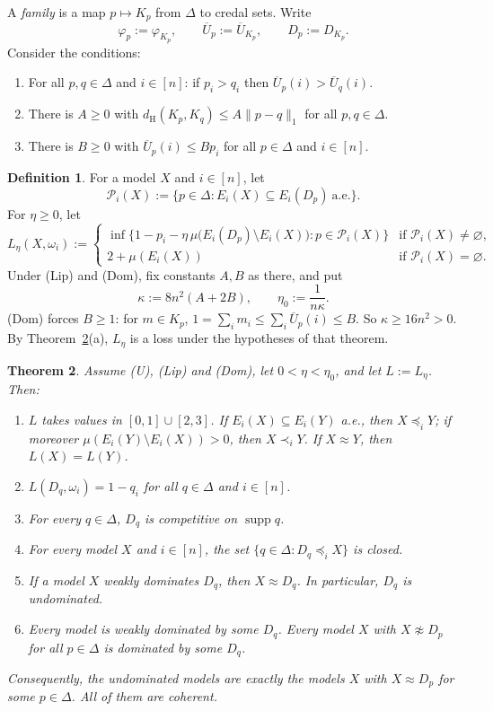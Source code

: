 \documentclass[11pt]{article}
\newtheorem{theorem}{Theorem}[section]
\theoremstyle{definition}
\newtheorem{definition}[theorem]{Definition}
\newcommand{\supp}{\operatorname{supp}}
\newcommand{\dH}{d_{\mathrm H}}
\newcommand{\Pc}{\mathcal P}
\newcommand{\Ub}{\overline U}
\newcommand{\aev}{\ \text{a.e.}}
\begin{document}
A \emph{family} is a map $p\mapsto K_p$ from $\Delta$ to credal sets. Write
\[
\varphi_p:=\varphi_{K_p},\qquad \Ub_p:=\Ub_{K_p},\qquad D_p:=D_{K_p}.
\]
Consider the conditions:
\begin{enumerate}[leftmargin=*,itemsep=2pt]
\item[\textbf{(U)}] For all $p,q\in\Delta$ and $i\in[n]$: if $p_i>q_i$ then $\Ub_p(i)>\Ub_q(i)$.
\item[\textbf{(Lip)}] There is $A\ge 0$ with $\dH(K_p,K_q)\le A\|p-q\|_1$ for all $p,q\in\Delta$.
\item[\textbf{(Dom)}] There is $B\ge 0$ with $\Ub_p(i)\le Bp_i$ for all $p\in\Delta$ and $i\in[n]$.
\end{enumerate}

\begin{definition}\label{def:loss}
For a model $X$ and $i\in[n]$, let
\[
\Pc_i(X):=\{p\in\Delta:E_i(X)\subseteq E_i(D_p)\aev\}.
\]
For $\eta\ge 0$, let
\[
L_\eta(X,\omega_i):=\begin{cases}
\inf\big\{1-p_i-\eta\,\mu\big(E_i(D_p)\setminus E_i(X)\big):p\in\Pc_i(X)\big\} & \text{if }\Pc_i(X)\neq\varnothing,\\[2pt]
2+\mu(E_i(X)) & \text{if }\Pc_i(X)=\varnothing.
\end{cases}
\]
Under (Lip) and (Dom), fix constants $A,B$ as there, and put
\[
\kappa:=8n^2(A+2B),\qquad \eta_0:=\frac{1}{n\kappa}.
\]
(Dom) forces $B\ge1$: for $m\in K_p$, $1=\sum_im_i\le\sum_i\Ub_p(i)\le B$. So $\kappa\ge16n^2>0$. By Theorem~\ref{thm:main}(a), $L_\eta$ is a loss under the hypotheses of that theorem.
\end{definition}

\begin{theorem}\label{thm:main}
Assume (U), (Lip) and (Dom), let $0<\eta<\eta_0$, and let $L:=L_\eta$. Then:
\begin{enumerate}[label=(\alph*)]
\item $L$ takes values in $[0,1]\cup[2,3]$. If $E_i(X)\subseteq E_i(Y)$ a.e., then $X\preceq_iY$; if moreover $\mu(E_i(Y)\setminus E_i(X))>0$, then $X\prec_iY$. If $X\approx Y$, then $L(X)=L(Y)$.
\item $L(D_q,\omega_i)=1-q_i$ for all $q\in\Delta$ and $i\in[n]$.
\item For every $q\in\Delta$, $D_q$ is competitive on $\supp q$.
\item For every model $X$ and $i\in[n]$, the set $\{q\in\Delta:D_q\preceq_iX\}$ is closed.
\item If a model $X$ weakly dominates $D_q$, then $X\approx D_q$. In particular, $D_q$ is undominated.
\item Every model is weakly dominated by some $D_q$. Every model $X$ with $X\not\approx D_p$ for all $p\in\Delta$ is dominated by some $D_q$.
\end{enumerate}
Consequently, the undominated models are exactly the models $X$ with $X\approx D_p$ for some $p\in\Delta$. All of them are coherent.
\end{theorem}
\end{document}
